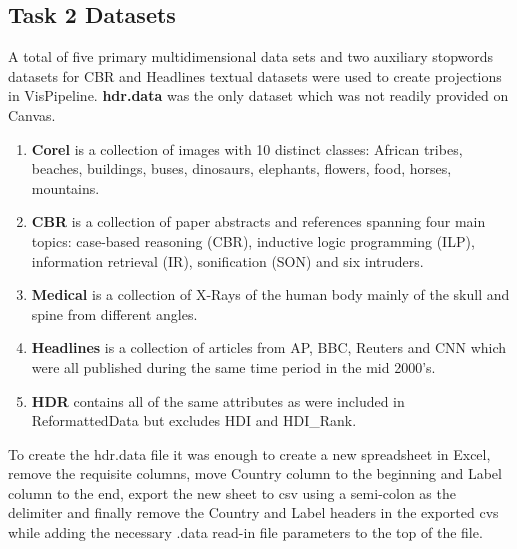 \documentclass[11pt,a4paper,final]{article}
\begin{document}
\subsection{Task 2 Datasets}
A total of five primary multidimensional data sets and two auxiliary stopwords datasets for CBR and Headlines textual datasets were used to create projections in VisPipeline. \textbf{hdr.data} was the only dataset which was not readily provided on Canvas.

\begin{enumerate}
	\item \textbf{Corel} is a collection of images with 10 distinct classes: African tribes, beaches, buildings, buses, dinosaurs, elephants, flowers, food, horses, mountains.
	\item \textbf{CBR} is a collection of paper abstracts and references spanning four main topics: case-based reasoning (CBR), inductive logic programming (ILP), information retrieval (IR), sonification (SON) and six intruders.
	\item \textbf{Medical} is a collection of X-Rays of the human body mainly of the skull and spine from different angles.
	\item \textbf{Headlines} is a collection of articles from AP, BBC, Reuters and CNN which were all published during the same time period in the mid 2000's.
	\item \textbf{HDR} contains all of the same attributes as were included in ReformattedData but excludes HDI and HDI\_Rank.
\end{enumerate}

To create the hdr.data file it was enough to create a new spreadsheet in Excel, remove the requisite columns, move Country column to the beginning and Label column to the end, export the new sheet to csv using a semi-colon as the delimiter and finally remove the Country and Label headers in the exported cvs while adding the necessary .data read-in file parameters to the top of the file.
\end{document}
